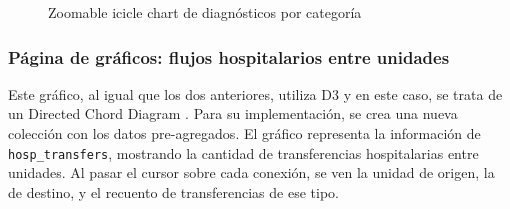 \begin{figure}[H]
  \centering
  \caption{Zoomable icicle chart de diagnósticos por categoría}
  \label{fig:chart-diag}
\end{figure}



\subsubsection{Página de gráficos: flujos hospitalarios entre unidades}

Este gráfico, al igual que los dos anteriores, utiliza D3 y en este caso, se trata de un Directed Chord Diagram \cite{chord}. Para su implementación, se crea una nueva colección con los datos pre-agregados. El gráfico representa la información de \texttt{hosp\_transfers}, mostrando la cantidad de transferencias hospitalarias entre unidades. Al pasar el cursor sobre cada conexión, se ven la unidad de origen, la de destino, y el recuento de transferencias de ese tipo.


